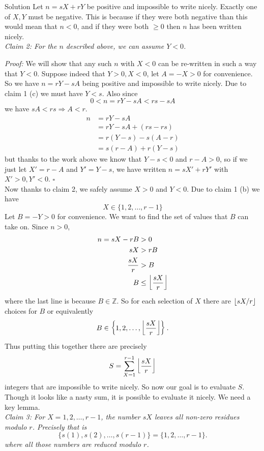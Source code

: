 \documentclass{article}
\begin{document}
\begin{solution}{Solution}
Let $n = sX + rY$ be positive and impossible to write nicely.
Exactly one of $X, Y$ must be negative. This is because if they were both
negative than this would mean that $n < 0$, and if they were both $\geq 0$
then $n$ has been written nicely. \\

\textit{Claim 2: For the $n$ described above, we can assume $Y < 0$.}
\vspace{0.2cm}

\textit{Proof:} We will show that any such $n$ with $X < 0$ can be
re-written in such a way that $Y < 0$. Suppose indeed that $Y > 0, X < 0$,
let $A = -X > 0$ for convenience. So we have $n = rY - sA$ being positive
and impossible to write nicely. Due to claim 1 (c) we must have $Y < s$.
Also since
$$
0 < n = rY - sA < rs - sA
$$
we have $sA < rs \Rightarrow A < r$.
\[
\begin{aligned}
n &= rY - sA \\
&= rY - sA + (rs - rs) \\
&= r(Y - s) - s(A - r) \\
&= s(r - A) + r(Y - s)
\end{aligned}
\]
but thanks to the work above we know that $Y - s < 0$ and $r - A > 0$,
so if we just let $X' = r-A$ and $Y' = Y-s$, we have written
$n = sX' + rY'$ with $X' > 0, Y' < 0$. $\square$ \\

Now thanks to claim 2, we safely assume $X > 0$ and $Y < 0$. Due to
claim 1 (b) we have
$$
X \in \{ 1,2,\ldots,r-1 \}
$$
Let $B = -Y > 0$ for convenience. We want to find the set of values that
$B$ can take on. Since $n > 0$,
\[
\begin{aligned}
n = sX - rB &> 0 \\
sX &> rB \\
\frac{sX}{r} &> B \\
B &\leq \left\lfloor  \frac{sX}{r}  \right\rfloor
\end{aligned}
\]
where the last line is because $B \in \mathbb{Z}$. So for each selection
of $X$ there are $\left\lfloor sX/r \right\rfloor$ choices for $B$ or equivalently
$$
B \in \left\{ 1,2,\ldots, \left\lfloor \frac{sX}{r} \right\rfloor \right\}.
$$
Thus putting this together there are precisely
$$
S = \sum_{X=1}^{r-1} \left\lfloor  \frac{sX}{r}  \right\rfloor
$$
integers that are impossible to write nicely. So now our goal is to
evaluate $S$. Though it looks like a nasty sum, it is possible to
evaluate it nicely. We need a key lemma. \\

\textit{Claim 3: For $X = 1,2,\ldots, r-1$, the number $sX$ leaves
all non-zero residues modulo $r$. Precisely that is
$$
\{ s(1), s(2),\ldots, s(r-1) \} = \{ 1, 2, \ldots, r-1 \}.
$$
where all those numbers are reduced modulo $r$.
}
\vspace{0.2cm}


\end{solution}
\end{document}
